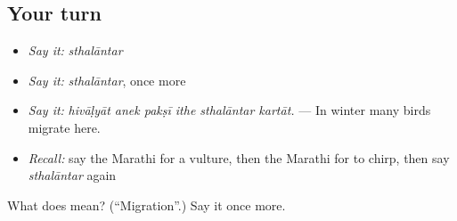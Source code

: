 \subsection*{Your turn}
\begin{itemize}
\raggedright
  \item \emph{Say it:} \emph{sthalāntar}
  \item \emph{Say it:} \emph{sthalāntar}, once more
  \item \emph{Say it:} \emph{hivāḷyāt anek pakṣī ithe sthalāntar kartāt.} — In winter many birds migrate here.
  \item \emph{Recall:} say the Marathi for a vulture, then the Marathi for to chirp, then say \emph{sthalāntar} again
\end{itemize}

\begin{tcolorbox}[breakable,colback=teal!4,colframe=teal!35!black,title={Before you move on}]
What does  mean? (\textquotedblleft{}Migration\textquotedblright{}.) Say it once more.
\end{tcolorbox}
